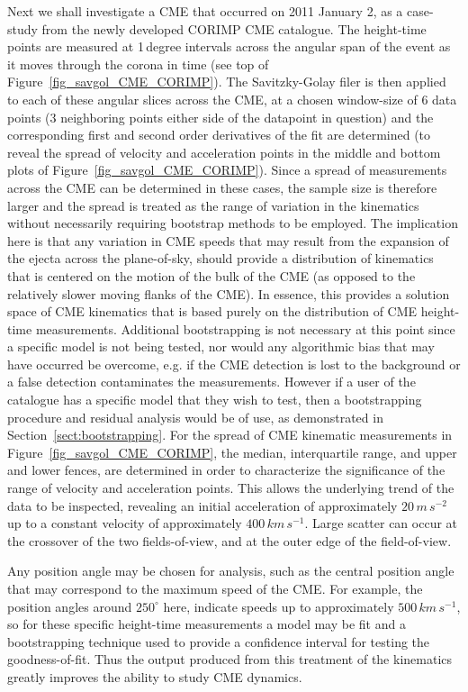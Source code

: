 \documentclass[structabstract]{aa}
\begin{document}
Next we shall investigate a CME that occurred on 2011 January 2, as a case-study from the newly developed CORIMP CME catalogue. The height-time points are measured at 1\,degree intervals across the angular span of the event as it moves through the corona in time (see top of Figure~\ref{fig_savgol_CME_CORIMP}). The Savitzky-Golay filer is then applied to each of these angular slices across the CME, at a chosen window-size of 6 data points (3 neighboring points either side of the datapoint in question) and the corresponding first and second order derivatives of the fit are determined (to reveal the spread of velocity and acceleration points in the middle and bottom plots of Figure~\ref{fig_savgol_CME_CORIMP}). Since a spread of measurements across the CME can be determined in these cases, the sample size is therefore larger and the spread is treated as the range of variation in the kinematics without necessarily requiring bootstrap methods to be employed. The implication here is that any variation in CME speeds that may result from the expansion of the ejecta across the plane-of-sky, should provide a distribution of kinematics that is centered on the motion of the bulk of the CME (as opposed to the relatively slower moving flanks of the CME). In essence, this provides a solution space of CME kinematics that is based purely on the distribution of CME height-time measurements. Additional bootstrapping is not necessary at this point since a specific model is not being tested, nor would any algorithmic bias that may have occurred be overcome, e.g. if the CME detection is lost to the background or a false detection contaminates the measurements. However if a user of the catalogue has a specific model that they wish to test, then a bootstrapping procedure and residual analysis would be of use, as demonstrated in Section~\ref{sect:bootstrapping}. For the spread of CME kinematic measurements in Figure~\ref{fig_savgol_CME_CORIMP}, the median, interquartile range, and upper and lower fences, are determined in order to characterize the significance of the range of velocity and acceleration points. This allows the underlying trend of the data to be inspected, revealing an initial acceleration of approximately $20\,m\,s^{-2}$ up to a constant velocity of approximately $400\,km\,s^{-1}$. Large scatter can occur at the crossover of the two fields-of-view, and at the outer edge of the field-of-view. 

Any position angle may be chosen for analysis, such as the central position angle that may correspond to the maximum speed of the CME. For example, the position angles around $250^{\circ}$ here, indicate speeds up to approximately $500\,km\,s^{-1}$, so for these specific height-time measurements a model may be fit and a bootstrapping technique used to provide a confidence interval for testing the goodness-of-fit. Thus the output produced from this treatment of the kinematics greatly improves the ability to study CME dynamics.
\end{document}
